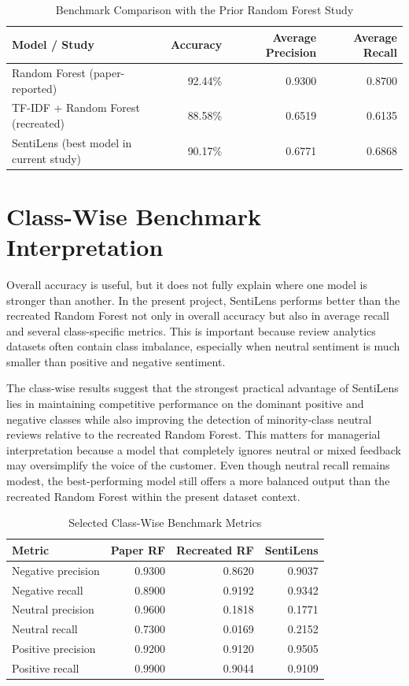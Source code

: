 \begin{table}[h]
\centering
\caption{Benchmark Comparison with the Prior Random Forest Study}
\begin{tabular}{lrrr}
\toprule
\textbf{Model / Study} & \textbf{Accuracy} & \textbf{Average Precision} & \textbf{Average Recall} \\
\midrule
Random Forest (paper-reported) & 92.44\% & 0.9300 & 0.8700 \\
TF-IDF + Random Forest (recreated) & 88.58\% & 0.6519 & 0.6135 \\
SentiLens (best model in current study) & 90.17\% & 0.6771 & 0.6868 \\
\bottomrule
\end{tabular}
\end{table}

\section{Class-Wise Benchmark Interpretation}

Overall accuracy is useful, but it does not fully explain where one model is stronger than another. In the present project, SentiLens performs better than the recreated Random Forest not only in overall accuracy but also in average recall and several class-specific metrics. This is important because review analytics datasets often contain class imbalance, especially when neutral sentiment is much smaller than positive and negative sentiment.

The class-wise results suggest that the strongest practical advantage of SentiLens lies in maintaining competitive performance on the dominant positive and negative classes while also improving the detection of minority-class neutral reviews relative to the recreated Random Forest. This matters for managerial interpretation because a model that completely ignores neutral or mixed feedback may oversimplify the voice of the customer. Even though neutral recall remains modest, the best-performing model still offers a more balanced output than the recreated Random Forest within the present dataset context.

\begin{table}[h]
\centering
\caption{Selected Class-Wise Benchmark Metrics}
\begin{tabular}{lrrr}
\toprule
\textbf{Metric} & \textbf{Paper RF} & \textbf{Recreated RF} & \textbf{SentiLens} \\
\midrule
Negative precision & 0.9300 & 0.8620 & 0.9037 \\
Negative recall & 0.8900 & 0.9192 & 0.9342 \\
Neutral precision & 0.9600 & 0.1818 & 0.1771 \\
Neutral recall & 0.7300 & 0.0169 & 0.2152 \\
Positive precision & 0.9200 & 0.9120 & 0.9505 \\
Positive recall & 0.9900 & 0.9044 & 0.9109 \\
\bottomrule
\end{tabular}
\end{table}

